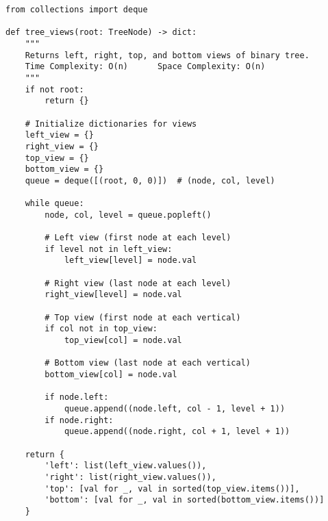 \begin{verbatim}
from collections import deque

def tree_views(root: TreeNode) -> dict:
    """
    Returns left, right, top, and bottom views of binary tree.
    Time Complexity: O(n)      Space Complexity: O(n)
    """
    if not root:
        return {}
    
    # Initialize dictionaries for views
    left_view = {}
    right_view = {}
    top_view = {}
    bottom_view = {}
    queue = deque([(root, 0, 0)])  # (node, col, level)
    
    while queue:
        node, col, level = queue.popleft()
        
        # Left view (first node at each level)
        if level not in left_view:
            left_view[level] = node.val
        
        # Right view (last node at each level)
        right_view[level] = node.val
        
        # Top view (first node at each vertical)
        if col not in top_view:
            top_view[col] = node.val
        
        # Bottom view (last node at each vertical)
        bottom_view[col] = node.val
        
        if node.left:
            queue.append((node.left, col - 1, level + 1))
        if node.right:
            queue.append((node.right, col + 1, level + 1))
    
    return {
        'left': list(left_view.values()),
        'right': list(right_view.values()),
        'top': [val for _, val in sorted(top_view.items())],
        'bottom': [val for _, val in sorted(bottom_view.items())]
    }
\end{verbatim}

